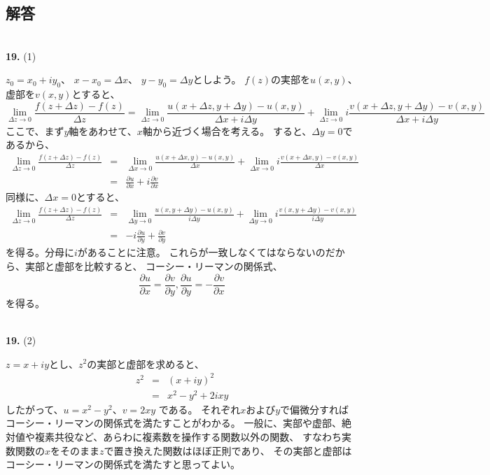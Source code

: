 \documentclass{jarticle}
\newcommand{\ans}[2]{\noindent\\ {\bf \large #1.} (#2)}
\begin{document}
\subsection{解答}

\ans{19}{1}

$z_0 = x_0 + i y_0$、
$x - x_0 = \Delta x$、
$y - y_0 = \Delta y$としよう。
$f(z)$の実部を$u(x,y)$、虚部を$v(x,y)$とすると、
$$
  \lim_{\Delta z \rightarrow 0} \frac{f(z+\Delta z) - f(z)}{\Delta z}
  =
  \lim_{\Delta z \rightarrow 0} \frac{u(x+\Delta z,y+\Delta y) - u(x,y)}{\Delta x + i \Delta y}
  + \lim_{\Delta z \rightarrow 0} i \frac{v(x+\Delta z,y+\Delta y) - v(x,y)}{\Delta x + i \Delta y}
$$
ここで、まず$y$軸をあわせて、$x$軸から近づく場合を考える。
すると、$\Delta y = 0$であるから、
\begin{eqnarray}
  \lim_{\Delta z \rightarrow 0} \frac{f(z+\Delta z) - f(z)}{\Delta z}
  &=&
  \lim_{\Delta x \rightarrow 0} \frac{u(x+\Delta x,y) - u(x,y)}{\Delta x}
  + \lim_{\Delta x \rightarrow 0} i \frac{v(x+\Delta x,y) - v(x,y)}{\Delta x}\\
  &=&
  \frac{\partial u}{\partial x} + i \frac{\partial v}{\partial x}
\end{eqnarray}
同様に、$\Delta x = 0$とすると、
\begin{eqnarray}
  \lim_{\Delta z \rightarrow 0} \frac{f(z+\Delta z) - f(z)}{\Delta z}
  &=&
  \lim_{\Delta y \rightarrow 0} \frac{u(x,y+\Delta y) - u(x,y)}{i\Delta y}
  + \lim_{\Delta y \rightarrow 0} i \frac{v(x,y+\Delta y) - v(x,y)}{i\Delta y}\\
  &=&
  -i \frac{\partial u}{\partial y} + \frac{\partial v}{\partial y}
\end{eqnarray}
を得る。分母に$i$があることに注意。
これらが一致しなくてはならないのだから、実部と虚部を比較すると、
コーシー・リーマンの関係式、
$$
  \frac{\partial u}{\partial x} = \frac{\partial v}{\partial y},
  \frac{\partial u}{\partial y} = -\frac{\partial v}{\partial x}
$$
を得る。

\ans{19}{2}

$z = x+ iy$とし、$z^2$の実部と虚部を求めると、
\begin{eqnarray}
  z^2 &=& (x+iy)^2\\
  &=& x^2 - y^2 +  2ixy
\end{eqnarray}
したがって、$u = x^2 - y^2$、$v = 2xy$
である。
それぞれ$x$および$y$で偏微分すればコーシー・リーマンの関係式を満たすことがわかる。
一般に、実部や虚部、絶対値や複素共役など、あらわに複素数を操作する関数以外の関数、
すなわち実数関数の$x$をそのまま$z$で置き換えた関数はほぼ正則であり、
その実部と虚部はコーシー・リーマンの関係式を満たすと思ってよい。
\end{document}
